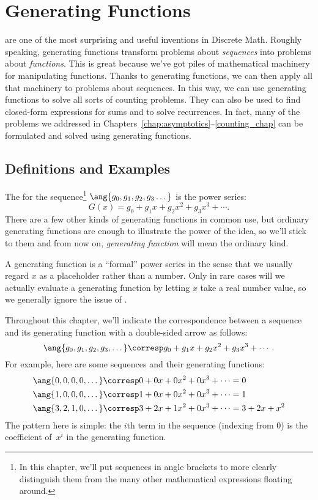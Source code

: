 \chapter{Generating Functions}\label{generating_function_chap}

 are one of the most surprising and useful
inventions in Discrete Math.  Roughly speaking, generating functions
transform problems about \emph{sequences} into problems about
\emph{functions}.  This is great because we've got piles of
mathematical machinery for manipulating functions.  Thanks to
generating functions, we can then apply all that machinery to problems
about sequences.  In this way, we can use generating functions to
solve all sorts of counting problems.  They can also be used to find
closed-form expressions for sums and to solve recurrences.  In fact,
many of the problems we addressed in
Chapters~\hbox{\ref{chap:asymptotics}--\ref{counting_chap}} can be
formulated and solved using generating functions.

\section{Definitions and Examples}

The  for the sequence\footnote{In
  this chapter, we'll put sequences in angle brackets to more clearly
  distinguish them from the many other mathematical expressions
  floating around.} $\ang{g_0, g_1, g_2, g_3 \dots}$ is the power
series:
\[
G(x) = g_0 + g_1 x + g_2 x^2 + g_3 x^3 + \cdots.
\]
There are a few other kinds of generating functions in common use, but
ordinary generating functions are enough to illustrate the power of
the idea, so we'll stick to them and from now on, \emph{generating
  function} will mean the ordinary kind.

A generating function is a ``formal'' power series in the sense that we
usually regard $x$ as a placeholder rather than a number.  Only in rare
cases will we actually evaluate a generating function by letting $x$ take
a real number value, so we generally ignore the issue of .

Throughout this chapter, we'll indicate the correspondence between a
sequence and its generating function with a double-sided arrow as
follows:
%
\[
\ang{g_0, g_1, g_2, g_3, \dots}
    \corresp g_0 + g_1 x + g_2 x^2 + g_3 x^3 + \cdots.
\]
%
For example, here are some sequences and their generating functions:
%
\begin{align*}
\ang{0, 0, 0, 0, \dots}
    & \corresp 0 + 0 x + 0 x^2 + 0 x^3 + \cdots = 0 \\
\ang{1, 0, 0, 0, \dots}
    & \corresp 1 + 0 x + 0 x^2 + 0 x^3 + \cdots = 1 \\
\ang{3, 2, 1, 0, \dots}
    & \corresp 3 + 2 x + 1 x^2 + 0 x^3 + \cdots = 3 + 2 x + x^2
\end{align*}
%
The pattern here is simple: the $i$th term in the sequence (indexing
from 0) is the coefficient of~$x^i$ in the generating function.

